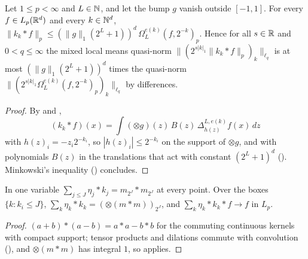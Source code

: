 \begin{theorem}
\label{thm:mixed-local-means-upper}
\leanok
{}
Let $1 \leq p < \infty$ and $L \in \mathbb{N}$, and let the bump $g$ vanish outside $[-1, 1]$. For every
$f \in L_p(\mathbb{R}^d)$ and every $k \in \mathbb{N}^d$,
$\|k_k * f\|_p \leq (\|g\|_1 (2^L + 1))^d \, \Omega^{e(k)}_L(f, 2^{-k})_p$. Hence for all
$s \in \mathbb{R}$ and $0 < q \leq \infty$ the mixed local means quasi-norm
$\|(2^{s|k|_1} \|k_k * f\|_p)_k\|_{\ell_q}$ is at most $(\|g\|_1 (2^L + 1))^d$ times the
quasi-norm $\|(2^{s|k|_1} \Omega^{e(k)}_L(f, 2^{-k})_p)_k\|_{\ell_q}$ by differences.
\end{theorem}

\begin{proof}
\leanok
By  and ,
\[
  (k_k * f)(x) = \int (\otimes g)(z) \, B(z) \, \Delta^{L, e(k)}_{h(z)} f(x) \, dz
\]
with $h(z)_i = -z_i 2^{-k_i}$, so $|h(z)_i| \leq 2^{-k_i}$ on the support of $\otimes g$, and with
polynomials $B(z)$ in the translations that act with constant $(2^L + 1)^d$
(). Minkowski's inequality () concludes.
\end{proof}

\begin{lemma}
\label{lem:mixed-reproducing}
\leanok
{}
In one variable $\sum_{j \leq J} \eta_j * k_j = m_{2^J} * m_{2^J}$ at every point. Over the boxes
$\{k : k_i \leq J\}$, $\sum_k \eta_k * k_k = (\otimes (m * m))_{2^J}$, and
$\sum_k \eta_k * k_k * f \to f$ in $L_p$.
\end{lemma}

\begin{proof}
\leanok
$(a + b) * (a - b) = a * a - b * b$ for the commuting continuous kernels with compact support;
tensor products and dilations commute with convolution (), and
$\otimes (m * m)$ has integral $1$, so  applies.
\end{proof}

